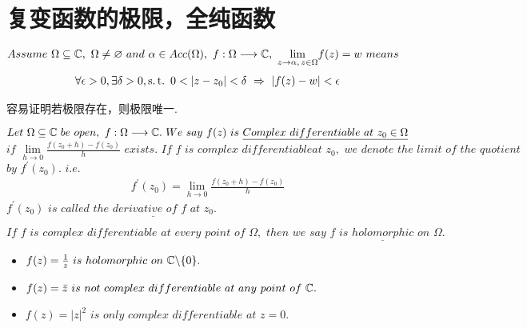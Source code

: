 \section{复变函数的极限，全纯函数}
	\begin{defn}\label{def 2.2.1}
		$Assume \,\, \Omega \subseteq \mathbb{C} , \,\, \Omega \neq \varnothing \,\, and \,\, \alpha \in Acc(\Omega) , \,\, f : \Omega \longrightarrow \mathbb{C} , \,\, \underset{z \to \alpha , \, z \in \Omega}{\lim}{f(z)} = w \,\, means$
		\begin{align}
			\forall \epsilon > 0 , \exists \delta > 0 , \operatorname{s.t.} \,\, 0 < \left| z - z_0 \right| < \delta \,\, \Rightarrow \,\, \left| f(z) - w \right| < \epsilon
		\end{align}
	
		\begin{rmk}
			容易证明若极限存在，则极限唯一.
		\end{rmk}
	\end{defn}

	\vspace*{2em}
	\begin{defn}\label{def 2.2.2}
		$Let \,\, \Omega \subseteq \mathbb{C} \,\, be \,\, open , \,\, f : \Omega \longrightarrow \mathbb{C} . \,\, We \,\, say \,\, f(z) \,\, is \,\, \underline{\textbf{$Complex \,\, differentiable \,\, at \,\, z_0 \in \Omega$}}$\\
		$if \,\, \underset{h \to 0}{\lim}{\frac{f(z_0 + h) - f(z_0)}{h}} \,\, exists. \,\, If \,\, f \,\, is \,\, complex \,\, differentiable at \,\, z_0 , \,\, we \,\, denote \,\, the \,\, limit \,\, of \,\, the \,\, quotient $\\ 
		$by \,\, f^{'}(z_0) . \,\, i.e.$
		\begin{align}
			f^{'}(z_0) = \lim_{h \to 0}{\frac{f(z_0 + h) - f(z_0)}{h}}
		\end{align}
		$f^{'}(z_0) \,\, is \,\, called \,\, \underline{\textbf{$the \,\, derivative \,\, of \,\, f \,\, at \,\, z_0$}}$.
		
		\begin{rmk}
			$If \,\, f \,\, is \,\, complex \,\, differentiable \,\, at \,\, every \,\, point \,\, of \,\, \Omega , \,\, then \,\, we \,\, say \,\, f \,\, is \,\, \underline{\textbf{$holomorphic$}} \,\, on \,\,  \Omega.$
		\end{rmk}
	\end{defn}

	\vspace*{2em}
	\begin{example}\label{ex 2.2.1}
		\begin{itemize}
			\item $f(z) = \frac{1}{z} \,\, is \,\, holomorphic \,\, on \,\, \mathbb{C} \backslash \{ 0 \}.$
			
			\item $f(z) = \bar{z} \,\, is \,\, not \,\, complex \,\, differentiable \,\, at \,\, any \,\, point \,\, of \,\, \mathbb{C}.$
			
			\item $f(z) = \left| z \right|^2 \,\, is \,\, only \,\, complex \,\, differentiable \,\, at \,\, z = 0.$
		\end{itemize}
	\end{example}

